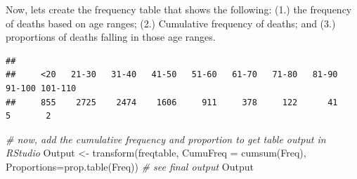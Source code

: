 \documentclass[
]{book}
\newenvironment{Shaded}{\begin{snugshade}}{\end{snugshade}}
\newcommand{\AttributeTok}[1]{\textcolor[rgb]{0.77,0.63,0.00}{#1}}
\newcommand{\CommentTok}[1]{\textcolor[rgb]{0.56,0.35,0.01}{\textit{#1}}}
\newcommand{\DecValTok}[1]{\textcolor[rgb]{0.00,0.00,0.81}{#1}}
\newcommand{\FunctionTok}[1]{\textcolor[rgb]{0.00,0.00,0.00}{#1}}
\newcommand{\NormalTok}[1]{#1}
\newcommand{\OtherTok}[1]{\textcolor[rgb]{0.56,0.35,0.01}{#1}}
\newcommand{\SpecialCharTok}[1]{\textcolor[rgb]{0.00,0.00,0.00}{#1}}
\newcommand{\StringTok}[1]{\textcolor[rgb]{0.31,0.60,0.02}{#1}}
\begin{document}
\begin{Shaded}
\end{Shaded}

Now, lets create the frequency table that shows the following: (1.) the frequency of deaths based on age ranges; (2.) Cumulative frequency of deaths; and (3.) proportions of deaths falling in those age ranges.

\begin{Shaded}
\end{Shaded}

\begin{verbatim}
## 
##     <20   21-30   31-40   41-50   51-60   61-70   71-80   81-90  91-100 101-110 
##     855    2725    2474    1606     911     378     122      41       5       2
\end{verbatim}

\begin{Shaded}
\begin{Highlighting}[]
\CommentTok{\# now, add the cumulative frequency and proportion to get table output in RStudio}
\NormalTok{Output }\OtherTok{\textless{}{-}} \FunctionTok{transform}\NormalTok{(freqtable, }\AttributeTok{CumuFreq =} \FunctionTok{cumsum}\NormalTok{(Freq), }\AttributeTok{Proportions=}\FunctionTok{prop.table}\NormalTok{(Freq))}
\CommentTok{\# see final output}
\NormalTok{Output}
\end{Highlighting}
\end{Shaded}
\end{document}
